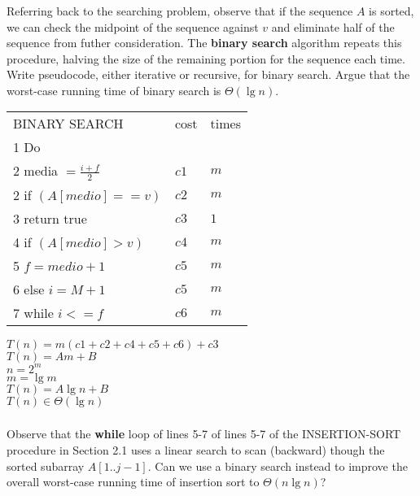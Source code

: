 \documentclass[a4paper,12pt]{article}
\begin{document}
    \subsubsection{} Referring back to the searching problem, observe
    that if the sequence $A$ is sorted, we can check the midpoint of the
    sequence against $v$ and eliminate half of the sequence from futher
    consideration. The \textbf{binary search} algorithm repeats this
    procedure, halving the size of the remaining portion for the
    sequence each time. Write pseudocode, either iterative or recursive, for
    binary search. Argue that the worst-case running time of binary search is
    $\Theta(\lg n)$.
    
    \begin{tabular}{l l l}
     BINARY SEARCH & cost & times \\
     1 Do & &	\\
     2 \hspace{0.5cm} media $= \frac{i + f}{2}$ & $c1$ & $m$ \\
     2 \hspace{0.5cm} if $(A[medio] == v)$ & $c2$ & $m$ \\
     3 \hspace{1cm} return true & $c3$ & $1$ \\
     4 \hspace{0.5cm} if $(A[medio] > v)$ & $c4$ & $m$ \\
     5 \hspace{1cm} $f = medio + 1$ & $c5$ & $m$ \\
     6 \hspace{0.5cm} else $i = M + 1$ & $c5$ & $m$ \\
     7 while $i <= f$ & $c6$ & $m$  \\
    \end{tabular}
     
     $T(n) = m(c1 + c2 + c4 + c5 + c6) + c3$ \\
     $T(n) = Am + B$ \\
     $n = 2^m$ \\
     $m = \lg m$ \\
     $T(n) = A\lg n + B$ \\
     $T(n) \in \Theta(\lg n)$ 

    \subsubsection{} Observe that the \textbf{while} loop of lines 5-7
    of lines 5-7 of the INSERTION-SORT procedure in Section 2.1 uses a linear
    search to scan (backward) though the sorted subarray $A[1..j-1]$.
    Can we use a binary search instead to improve the overall worst-case
    running time of insertion sort to $\Theta(n \lg n)$?
    
\end{document}
